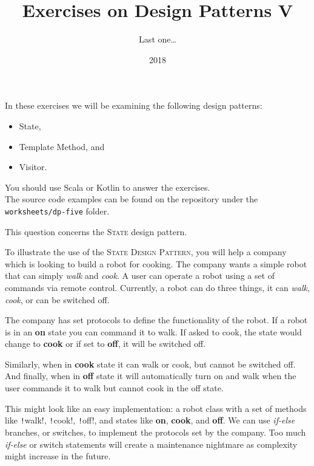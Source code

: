 \documentclass[12pt,a4paper,answers]{exam}
\title{Exercises on Design Patterns V}
\author{Last one\ldots}
\date{2018}
\newcommand{\codesol}{/Users/keith/Courses/sdp/SDP-2017/exercises/week11sol/src/main/scala}
\begin{document}
\maketitle

In these exercises we will be examining the following design patterns:
\begin{itemize}
\item State,
\item Template Method, and
\item Visitor.	
\end{itemize}


You should use Scala or Kotlin to answer the exercises.\\
The source code examples can be found on the repository under the 
\verb!worksheets/dp-five! folder.

\begin{questions}


\question
This question concerns the \textsc{State} design pattern.

To illustrate the use of the \textsc{State Design Pattern}, you will help a company which is 
looking to build a robot for cooking. 
The company wants a simple robot that can simply \emph{walk} and \emph{cook}. 
A user can operate a robot using a set of commands via remote control. 
Currently, a robot can do three things, it can \emph{walk}, \emph{cook}, or can be switched off.

The company has set protocols to define the functionality of the robot. 
If a robot is in an \textbf{on} state you can command it to walk. 
If asked to cook, the state would change to \textbf{cook} or if set to \textbf{off}, it will be 
switched off.

Similarly, when in \textbf{cook} state it can walk or cook, but cannot be switched off. And 
finally, when in \textbf{off} state it will automatically turn on and walk when the user commands 
it to walk but cannot cook in the off state.

This might look like an easy implementation: a robot class with a set of methods like 
\texttt!walk!, 
\texttt!cook!, \texttt!off!, and states like \textbf{on}, \textbf{cook}, and 
\textbf{off}. 
We can use \emph{if-else} branches, or switches, to implement the protocols set by the company. 
Too much \emph{if-else} or switch statements will create a maintenance nightmare as complexity 
might increase in the future.


\end{questions}
\end{document}
